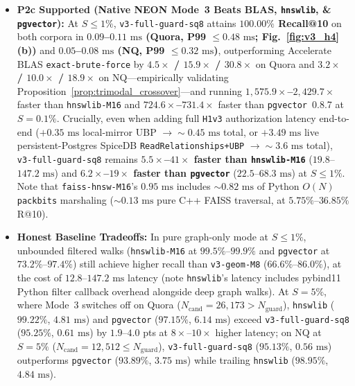 \documentclass[conference]{IEEEtran}
\begin{document}
\begin{itemize}
    \item \textbf{P2c Supported (Native NEON Mode~3 Beats BLAS, \texttt{hnswlib}, \& \texttt{pgvector}):} At $S \le 1\%$, \texttt{v3-full-guard-sq8} attains \textbf{$100.00\%$ Recall@10} on both corpora in \textbf{$0.09$--$0.11\text{ ms}$ (Quora, P99 $\le 0.48\text{ ms}$; Fig.~\ref{fig:v3_h4}(b))} and \textbf{$0.05$--$0.08\text{ ms}$ (NQ, P99 $\le 0.32\text{ ms}$)}, outperforming Accelerate BLAS \texttt{exact-brute-force} by \textbf{$4.5\times$ / $15.9\times$ / $30.8\times$} on Quora and \textbf{$3.2\times$ / $10.0\times$ / $18.9\times$} on NQ---empirically validating Proposition~\ref{prop:trimodal_crossover}---and running \textbf{$1{,}575.9\times$--$2{,}429.7\times$} faster than \texttt{hnswlib-M16} and \textbf{$724.6\times$--$731.4\times$} faster than \texttt{pgvector}~0.8.7 at $S=0.1\%$. Crucially, even when adding full \texttt{H1v3} authorization latency end-to-end ($+0.35\text{ ms}$ local-mirror UBP $\to {\sim}0.45\text{ ms}$ total, or $+3.49\text{ ms}$ live persistent-Postgres SpiceDB \texttt{ReadRelationships+UBP} $\to {\sim}3.6\text{ ms}$ total), \texttt{v3-full-guard-sq8} remains \textbf{$5.5\times$--$41\times$ faster than \texttt{hnswlib-M16}} ($19.8$--$147.2\text{ ms}$) and \textbf{$6.2\times$--$19\times$ faster than \texttt{pgvector}} ($22.5$--$68.3\text{ ms}$) at $S \le 1\%$. Note that \texttt{faiss-hnsw-M16}'s $0.95\text{ ms}$ includes ${\sim}0.82\text{ ms}$ of Python $O(N)$ \texttt{packbits} marshaling (${\sim}0.13\text{ ms}$ pure C++ FAISS traversal, at $5.75\%$--$36.85\%$ R@10).
    \item \textbf{Honest Baseline Tradeoffs:} In pure graph-only mode at $S \le 1\%$, unbounded filtered walks (\texttt{hnswlib-M16} at $99.5\%$--$99.9\%$ and \texttt{pgvector} at $73.2\%$--$97.4\%$) still achieve higher recall than \texttt{v3-geom-M8} ($66.6\%$--$86.0\%$), at the cost of $12.8$--$147.2\text{ ms}$ latency (note \texttt{hnswlib}'s latency includes pybind11 Python filter callback overhead alongside deep graph walks). At $S=5\%$, where Mode~3 switches off on Quora ($N_{\text{cand}} = 26{,}173 > N_{\text{guard}}$), \texttt{hnswlib} ($99.22\%$, $4.81\text{ ms}$) and \texttt{pgvector} ($97.15\%$, $6.14\text{ ms}$) exceed \texttt{v3-full-guard-sq8} ($95.25\%$, $0.61\text{ ms}$) by $1.9$--$4.0$ pts at $8\times$--$10\times$ higher latency; on NQ at $S=5\%$ ($N_{\text{cand}}=12{,}512 \le N_{\text{guard}}$), \texttt{v3-full-guard-sq8} ($95.13\%$, $0.56\text{ ms}$) outperforms \texttt{pgvector} ($93.89\%$, $3.75\text{ ms}$) while trailing \texttt{hnswlib} ($98.95\%$, $4.84\text{ ms}$).
\end{itemize}
\end{document}
